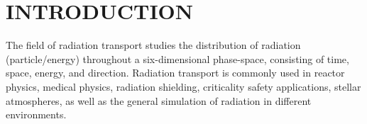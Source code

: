 %
%
%
%



\pagestyle{plain} %
\setcounter{page}{1}


\chapter{\uppercase {INTRODUCTION}}\label{cha:introduction}


The field of radiation transport studies the distribution of radiation (particle/energy) throughout a six-dimensional phase-space, consisting of time, space, energy, and direction. 
Radiation transport is commonly used in reactor physics, medical physics, radiation shielding, criticality safety applications, stellar atmospheres, as well as the general simulation of radiation in different environments. 

